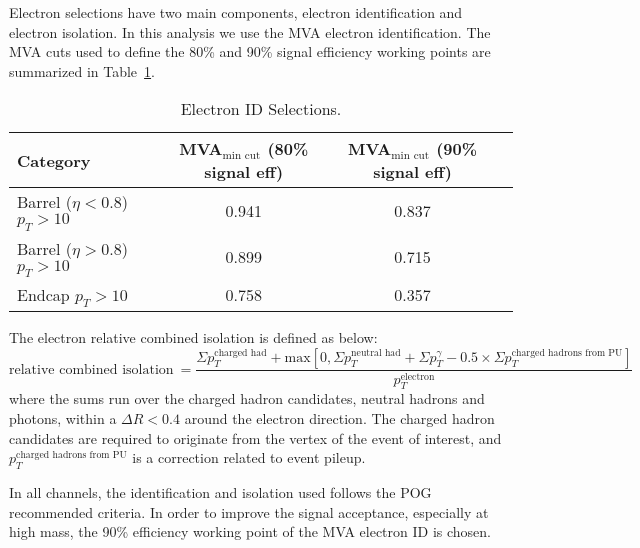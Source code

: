 Electron selections have two main components, electron  identification and electron isolation. 
In this analysis we use the MVA electron identification. 
The MVA cuts used to define the 80\% and 90\% signal efficiency working points are summarized in Table~\ref{eIDtable}. 

\begin{table}[ht]
\begin{center}
 \caption{Electron ID Selections.\label{eIDtable}}
 \begin{tabular}{| l | c | c | c |}
 \hline\hline
       Category                             & MVA$_{\textrm{min cut}}$ (80\% signal eff)    & MVA$_{\textrm{min cut}}$ (90\% signal eff)  \\[0.5ex] \hline
       Barrel ($\eta < 0.8$) $p_{T}>10$     & 0.941                                         & 0.837             	\\
       Barrel ($\eta > 0.8$) $p_{T}>10$     & 0.899                                         & 0.715             	\\
       Endcap $p_{T}>10$                    & 0.758                                         & 0.357             	\\
 \hline
 \hline
 \end{tabular}
\end{center}
\end{table}

The electron relative combined isolation is defined as below:
\begin{equation}
\text{relative combined isolation}~= \frac{\Sigma p_T^{\text{charged had}} + \text{max}[0, \Sigma p_T^{\text{neutral had}} + 
\Sigma p_T^{\gamma} - 0.5\times\Sigma p_T^{\text{charged hadrons from PU}}]}{p_T^{\text{electron}}}
\end{equation}
where the sums run over the charged hadron candidates, neutral hadrons and photons, within a $\Delta R < 0.4$ around 
the electron direction. The charged hadron candidates are required to originate from the vertex of the event of 
interest, and $p_T^{\text{charged hadrons from PU}}$ is a correction related to event pileup.


In all channels, the identification and isolation used follows the POG recommended criteria. In order to improve the signal 
acceptance, especially at high mass,  the 90\% efficiency working point of the MVA electron ID is chosen.

